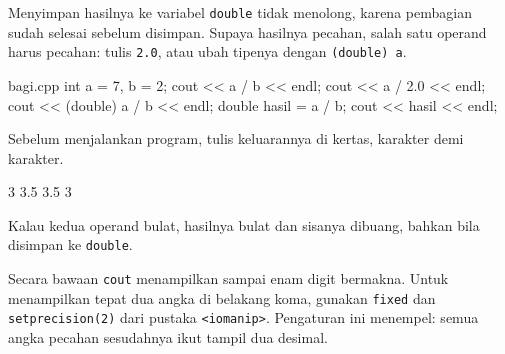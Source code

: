 \documentclass[a4paper]{article}
\begin{document}
Menyimpan hasilnya ke variabel \texttt{double} tidak menolong, karena pembagian sudah selesai sebelum disimpan. Supaya hasilnya pecahan, salah satu operand harus pecahan: tulis \texttt{2.0}, atau ubah tipenya dengan \texttt{(double) a}.

\begin{MKode}{bagi.cpp}
int a = 7, b = 2;
cout << a / b << endl;
cout << a / 2.0 << endl;
cout << (double) a / b << endl;
double hasil = a / b;
cout << hasil << endl;
\end{MKode}
\begin{Tebak}[]
Sebelum menjalankan program, tulis keluarannya di kertas, karakter demi karakter.
\end{Tebak}
\begin{Jawaban}[]
\begin{MKeluaran}[]
3
3.5
3.5
3
\end{MKeluaran}
Kalau kedua operand bulat, hasilnya bulat dan sisanya dibuang, bahkan bila disimpan ke \texttt{double}.
\end{Jawaban}
Secara bawaan \texttt{cout} menampilkan sampai enam digit bermakna. Untuk menampilkan tepat dua angka di belakang koma, gunakan \texttt{fixed} dan \texttt{setprecision(2)} dari pustaka \texttt{<iomanip>}. Pengaturan ini menempel: semua angka pecahan sesudahnya ikut tampil dua desimal.
\end{document}
